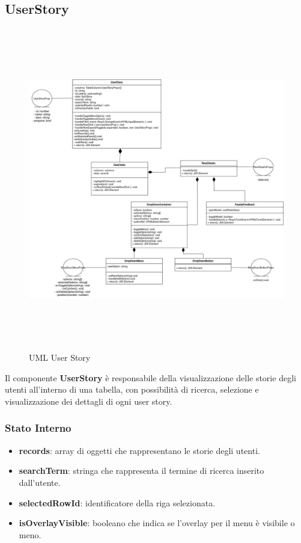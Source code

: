 \documentclass{article}
\begin{document}
\subsection{UserStory}
\begin{figure}[H]
    \centering
    \includegraphics[width=1\textwidth, height=400pt]{documenti/imgUMLFrontend/User.jpg}
    \caption{UML User Story}
    \label{fig:uml-userStory}
\end{figure}
Il componente \textbf{UserStory} è responsabile della visualizzazione delle storie degli utenti all'interno di una tabella, con possibilità di ricerca, selezione e visualizzazione dei dettagli di ogni user story.

\subsubsection*{Stato Interno}
\begin{itemize}
    \item \textbf{records}: array di oggetti che rappresentano le storie degli utenti.
    \item \textbf{searchTerm}: stringa che rappresenta il termine di ricerca inserito dall'utente.
    \item \textbf{selectedRowId}: identificatore della riga selezionata.
    \item \textbf{isOverlayVisible}: booleano che indica se l'overlay per il menu è visibile o meno.
\end{itemize}
\end{document}
